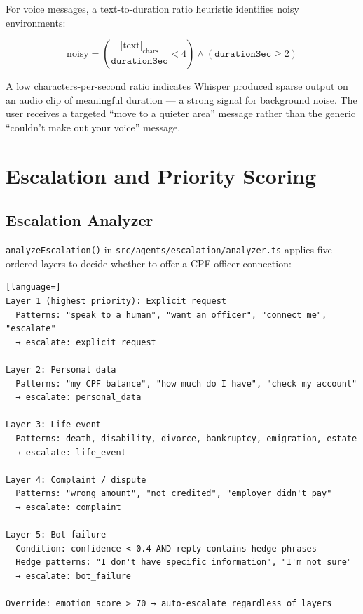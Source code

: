 \documentclass[12pt,a4paper]{article}
\begin{document}
For voice messages, a text-to-duration ratio heuristic identifies noisy environments:

\[
\text{noisy} = \left(\frac{|\text{text}|_{\text{chars}}}{\texttt{durationSec}} < 4\right) \land (\texttt{durationSec} \geq 2)
\]

A low characters-per-second ratio indicates Whisper produced sparse output on an
audio clip of meaningful duration — a strong signal for background noise. The user
receives a targeted ``move to a quieter area'' message rather than the generic
``couldn't make out your voice'' message.

\section{Escalation and Priority Scoring}
\label{sec:escalation}

\subsection{Escalation Analyzer}

\texttt{analyzeEscalation()} in \texttt{src/agents/escalation/analyzer.ts} applies
five ordered layers to decide whether to offer a CPF officer connection:

\begin{lstlisting}[language=]
Layer 1 (highest priority): Explicit request
  Patterns: "speak to a human", "want an officer", "connect me", "escalate"
  → escalate: explicit_request

Layer 2: Personal data
  Patterns: "my CPF balance", "how much do I have", "check my account"
  → escalate: personal_data

Layer 3: Life event
  Patterns: death, disability, divorce, bankruptcy, emigration, estate
  → escalate: life_event

Layer 4: Complaint / dispute
  Patterns: "wrong amount", "not credited", "employer didn't pay"
  → escalate: complaint

Layer 5: Bot failure
  Condition: confidence < 0.4 AND reply contains hedge phrases
  Hedge patterns: "I don't have specific information", "I'm not sure"
  → escalate: bot_failure

Override: emotion_score > 70 → auto-escalate regardless of layers
\end{lstlisting}
\end{document}
